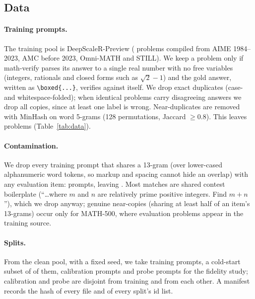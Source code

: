 

\subsection{Data}\label{sec:setup-data}
\paragraph{Training prompts.} The training pool is DeepScaleR-Preview \citep{deepscaler2025}
(\nPoolRaw{} problems compiled from AIME 1984--2023, AMC before 2023, Omni-MATH and STILL).
We keep a problem only if math-verify \citep{mathverify} parses its answer to a single real
number with no free variables (integers, rationals and closed forms such as $\sqrt2-1$) and the
gold answer, written as \verb|\boxed{...}|, verifies against itself. We drop exact duplicates
(case- and whitespace-folded); when identical problems carry disagreeing answers we drop all
copies, since at least one label is wrong. Near-duplicates are removed with MinHash on word
5-grams (128 permutations, Jaccard $\ge 0.8$). This leaves \nPoolFiltered{} problems
(Table~\ref{tab:data}).

\paragraph{Contamination.} We drop every training prompt that shares a 13-gram (over lower-cased
alphanumeric word tokens, so markup and spacing cannot hide an overlap) with any evaluation item:
\nDecontDropped{} prompts, leaving \nPoolClean{}. Most matches are shared contest boilerplate
(``\dots where $m$ and $n$ are relatively prime positive integers. Find $m+n$''), which we drop
anyway; genuine near-copies (sharing at least half of an item's 13-grams) occur only for
MATH-500, where \nMathNearCopy{} evaluation problems appear in the training source.

\paragraph{Splits.} From the clean pool, with a fixed seed, we take \nTrain{} training prompts,
a cold-start subset of \nColdstart{} of them, \nCalib{} calibration prompts and \nProbe{} probe
prompts for the fidelity study; calibration and probe are disjoint from training and from each
other. A manifest records the hash of every file and of every split's id list.

